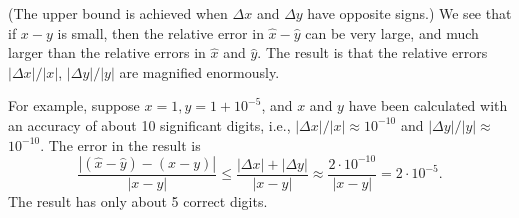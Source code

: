 (The upper bound is achieved when $ \Delta x $ and $ \Delta y $ have opposite signs.) We see that if $ x-y $ is small, then the relative error in $ \hat{x}-\hat{y} $ can be very large, and much larger than the relative errors in $ \hat{x} $ and $ \hat{y} $. The result is that the relative errors $ |\Delta x| /|x| $, $ |\Delta y| /|y| $ are magnified enormously.

For example, suppose $ x=1, y=1+10^{-5} $, and $ x $ and $ y $ have been calculated with an accuracy of about 10 significant digits, i.e., $ |\Delta x| /|x| \approx 10^{-10} $ and $ |\Delta y| /|y| \approx $ $ 10^{-10} $. The error in the result is
$$
\frac{|(\hat{x}-\hat{y})-(x-y)|}{|x-y|} \leq \frac{|\Delta x|+|\Delta y|}{|x-y|} \approx \frac{2 \cdot 10^{-10}}{|x-y|}=2 \cdot 10^{-5} .
$$
The result has only about 5 correct digits.


